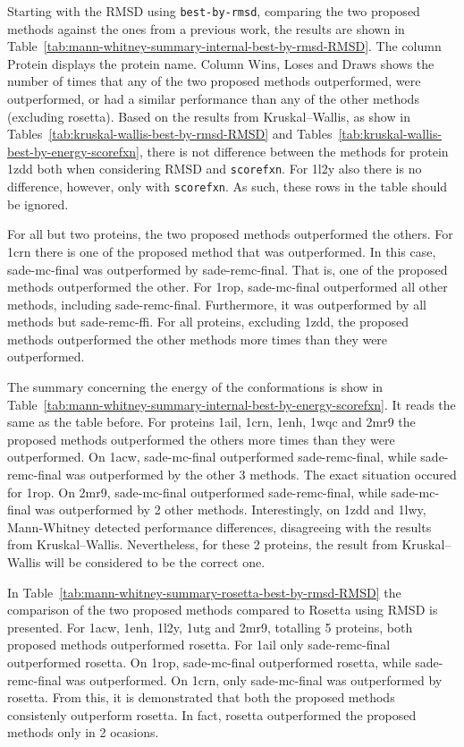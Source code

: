 

Starting with the RMSD using \texttt{best-by-rmsd}, comparing the two proposed
methods against the ones from a previous work, the results are shown in
Table~\ref{tab:mann-whitney-summary-internal-best-by-rmsd-RMSD}. The column
Protein displays the protein name. Column Wins, Loses and Draws shows the number
of times that any of the two proposed methods outperformed, were outperformed,
or had a similar performance than any of the other methods (excluding rosetta).
Based on the results from Kruskal–Wallis, as show in
Tables~\ref{tab:kruskal-wallis-best-by-rmsd-RMSD} and
Tables~\ref{tab:kruskal-wallis-best-by-energy-scorefxn}, there is not
difference between the methods for protein 1zdd both when considering RMSD and
\texttt{scorefxn}. For 1l2y also there is no difference, however, only with
\texttt{scorefxn}. As such, these rows in the table should be ignored.

For all but two proteins, the two proposed methods outperformed the others. For
1crn there is one of the proposed method that was outperformed. In this case,
sade-mc-final was outperformed by sade-remc-final. That is, one of the proposed
methods outperformed the other. For 1rop, sade-mc-final outperformed all other
methods, including sade-remc-final. Furthermore, it was outperformed by all
methods but sade-remc-ffi. For all proteins, excluding 1zdd, the proposed
methods outperformed the other methods more times than they were outperformed.

The summary concerning the energy of the conformations is show in
Table~\ref{tab:mann-whitney-summary-internal-best-by-energy-scorefxn}. It
reads the same as the table before. For proteins 1ail, 1crn, 1enh, 1wqc and 2mr9
the proposed methods outperformed the others more times than they were
outperformed. On 1acw, sade-mc-final outperformed sade-remc-final, while
sade-remc-final was outperformed by the other 3 methods. The exact situation
occured for 1rop. On 2mr9, sade-mc-final outperformed sade-remc-final, while
sade-mc-final was outperformed by 2 other methods. Interestingly, on 1zdd
and 1lwy, Mann-Whitney detected performance differences, disagreeing with
the results from Kruskal–Wallis. Nevertheless, for these 2 proteins, the result
from Kruskal–Wallis will be considered to be the correct one.



In Table~\ref{tab:mann-whitney-summary-rosetta-best-by-rmsd-RMSD} the
comparison of the two proposed methods compared to Rosetta using RMSD is
presented. For 1acw, 1enh, 1l2y, 1utg and 2mr9, totalling 5 proteins, both
proposed methods outperformed rosetta. For 1ail only sade-remc-final
outperformed rosetta. On 1rop, sade-mc-final outperformed rosetta, while
sade-remc-final was outperformed. On 1crn, only sade-mc-final was outperformed
by rosetta. From this, it is demonstrated that both the proposed methods
consistenly outperform rosetta. In fact, rosetta outperformed the proposed
methods only in 2 ocasions.

